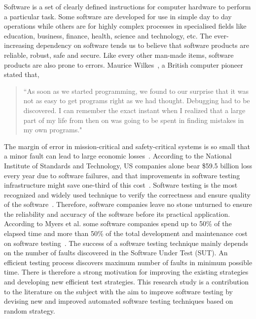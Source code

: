 Software is a set of clearly defined instructions for computer hardware to perform a particular task. Some software are developed for use in simple day to day operations while others are for highly complex processes in specialised fields like education, business, finance, health, science and technology, etc. The ever-increasing dependency on software tends us to believe that software products are reliable, robust, safe and secure. Like every other man-made items, software products are also prone to errors. Maurice Wilkes~\cite{wilkes1985memoirs}, a British computer pioneer stated that,
\smallskip
\begin{quote}
``As soon as we started programming, we found to our surprise that it was not as easy to get programs right as we had thought. Debugging had to be discovered. I can remember the exact instant when I realized that a large part of my life from then on was going to be spent in finding mistakes in my own programs."
\end{quote}
\bigskip
The margin of error in mission-critical and safety-critical systems is so small that a minor fault can lead to large economic losses~\cite{huang2004securing}. According to the National Institute of Standards and Technology, US companies alone bear \$59.5 billion loss every year due to software failures, and that improvements in software testing infrastructure might save one-third of this cost~\cite{tassey2002economic}. Software testing is the most recognized and widely used technique to verify the correctness and ensure quality of the software~\cite{patton2001software}. Therefore, software companies leave no stone unturned to ensure the reliability and accuracy of the software before its practical application. According to Myers et al. some software companies spend up to 50\% of the elapsed time and more than 50\% of the total development and maintenance cost on software testing~\cite{myers2011art}. The success of a software testing technique mainly depends on the number of faults discovered in the Software Under Test (SUT). An efficient testing process discovers maximum number of faults in minimum possible time. There is therefore a strong motivation for improving the existing strategies and developing new efficient test strategies. This research study is a contribution to the literature on the subject with the aim to improve software testing by devising new and improved automated software testing techniques based on random strategy.

